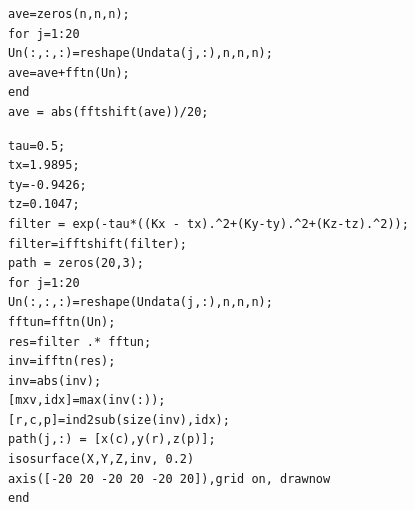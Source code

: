 \documentclass[12pt]{article}
\begin{document}
\begin{lstlisting}[caption={N-Dimensional Fast Fourier Transformation and Averaging}, frame=single]
ave=zeros(n,n,n);
for j=1:20
Un(:,:,:)=reshape(Undata(j,:),n,n,n);
ave=ave+fftn(Un);
end
ave = abs(fftshift(ave))/20;
\end{lstlisting}
\begin{lstlisting}[caption={Gaussian Filter and Inverse N-Dimensional Fast Fourier Transformation}, frame=single]
tau=0.5;
tx=1.9895;
ty=-0.9426;
tz=0.1047;
filter = exp(-tau*((Kx - tx).^2+(Ky-ty).^2+(Kz-tz).^2));
filter=ifftshift(filter);
path = zeros(20,3);
for j=1:20
Un(:,:,:)=reshape(Undata(j,:),n,n,n);
fftun=fftn(Un);
res=filter .* fftun;
inv=ifftn(res);
inv=abs(inv);
[mxv,idx]=max(inv(:));
[r,c,p]=ind2sub(size(inv),idx);
path(j,:) = [x(c),y(r),z(p)];
isosurface(X,Y,Z,inv, 0.2)
axis([-20 20 -20 20 -20 20]),grid on, drawnow
end
\end{lstlisting}
\end{document}
